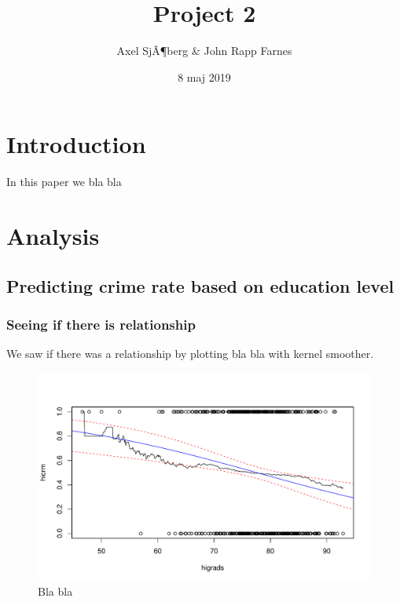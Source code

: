 \documentclass[a4paper]{article}
\title{Project 2}
\author{Axel SjÃ¶berg \& John Rapp Farnes}
\date{8 maj 2019}
\begin{document}
\maketitle

{
\setcounter{tocdepth}{3}
\tableofcontents
}
\newpage

\section{Introduction}\label{introduction}

In this paper we bla bla

\section{Analysis}\label{analysis}

\subsection{Predicting crime rate based on education
level}\label{predicting-crime-rate-based-on-education-level}

\subsubsection{Seeing if there is
relationship}\label{seeing-if-there-is-relationship}

We saw if there was a relationship by plotting bla bla with kernel
smoother.

\begin{figure}[h]
\includegraphics{Project_2_files/figure-latex/code_plot-1} \caption{Bla bla}\label{fig:code_plot}
\end{figure}
\end{document}
